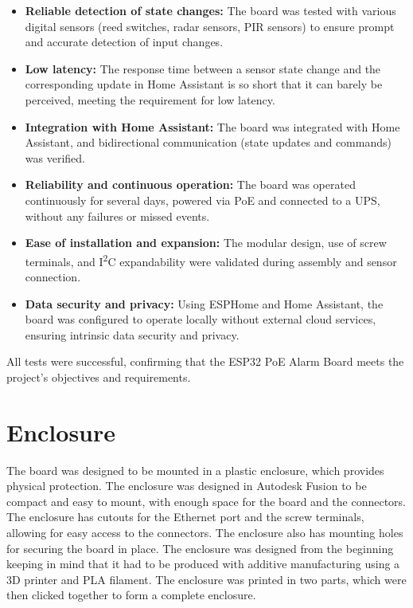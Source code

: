 \documentclass[a4paper,12pt]{article}
\begin{document}
\begin{itemize}
    \item \textbf{Reliable detection of state changes:} The board was tested with various digital sensors (reed switches, radar sensors, PIR sensors) to ensure prompt and accurate detection of input changes.
    \item \textbf{Low latency:} The response time between a sensor state change and the corresponding update in Home Assistant is so short that it can barely be perceived, meeting the requirement for low latency.
    \item \textbf{Integration with Home Assistant:} The board was integrated with Home Assistant, and bidirectional communication (state updates and commands) was verified.
    \item \textbf{Reliability and continuous operation:} The board was operated continuously for several days, powered via PoE and connected to a UPS, without any failures or missed events.
    \item \textbf{Ease of installation and expansion:} The modular design, use of screw terminals, and I\textsuperscript{2}C expandability were validated during assembly and sensor connection.
    \item \textbf{Data security and privacy:} Using ESPHome and Home Assistant, the board was configured to operate locally without external cloud services, ensuring intrinsic data security and privacy.
\end{itemize}

All tests were successful, confirming that the ESP32 PoE Alarm Board meets the project's objectives and requirements.

\newpage
\section{Enclosure}
The board was designed to be mounted in a plastic enclosure, which provides physical protection. The enclosure was designed in Autodesk Fusion \cite{AutodeskFusion3D} to be compact and easy to mount, with enough space for the board and the connectors. The enclosure has cutouts for the Ethernet port and the screw terminals, allowing for easy access to the connectors. The enclosure also has mounting holes for securing the board in place.
The enclosure was designed from the beginning keeping in mind that it had to be produced with additive manufacturing using a 3D printer and PLA filament. 
The enclosure was printed in two parts, which were then clicked together to form a complete enclosure. 
\end{document}
